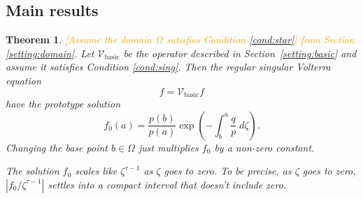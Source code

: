 \documentclass{article}
\newtheorem{defn}{Definition}
\theoremstyle{plain}
\newtheorem{thm}{Theorem}
\newcommand{\hardpart}{\mathcal{V}_\text{basic}}
\newcommand{\domain}{\Omega}
\begin{document}
\subsection{Main results}
\begin{thm}\label{thm:basic_volterra}
\textcolor{orange}{[Assume the domain $\domain$ satisfies {\em Condition \eqref{cond:star}}] from Section \ref{setting:domain}}.
Let $\hardpart$ be the operator described in Section~\ref{setting:basic} and assume it satisfies {\em Condition \eqref{cond:sing}}. Then the regular singular Volterra equation
\[ f = \hardpart f \]
have the {\em prototype solution}
\begin{equation}\label{eqn:test_solution}
f_0(a)=\frac{p(b)}{p(a)} \exp\left(-\int_{b}^{a}\frac{q}{p}\;d\zeta\right).
\end{equation}
Changing the base point $b \in \domain$ just multiplies $f_0$ by a non-zero constant.

The solution $f_0$ scales like $\zeta^{\tau-1}$ as $\zeta$ goes to zero. To be precise, as $\zeta$ goes to zero, $|f_0/\zeta^{\tau-1}|$ settles into a compact interval that doesn't include zero.
\end{thm}
\end{document}
